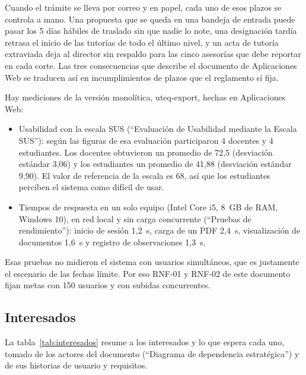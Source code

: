 Cuando el trámite se lleva por correo y en papel, cada uno de esos plazos se controla a mano. Una propuesta que se queda en una bandeja de entrada puede pasar los 5 días hábiles de traslado sin que nadie lo note, una designación tardía retrasa el inicio de las tutorías de todo el último nivel, y un acta de tutoría extraviada deja al director sin respaldo para las cinco asesorías que debe reportar en cada corte. Las tres consecuencias que describe el documento de Aplicaciones Web se traducen así en incumplimientos de plazos que el reglamento sí fija.

Hay mediciones de la versión monolítica, uteq-export, hechas en Aplicaciones Web:

\begin{itemize}
  \item Usabilidad con la escala SUS (\enquote{Evaluación de Usabilidad mediante la Escala SUS}): según las figuras de esa evaluación participaron 4 docentes y 4 estudiantes. Los docentes obtuvieron un promedio de 72,5 (desviación estándar 3,06) y los estudiantes un promedio de 41,88 (desviación estándar 9,90). El valor de referencia de la escala es 68, así que los estudiantes perciben el sistema como difícil de usar.
  \item Tiempos de respuesta en un solo equipo (Intel Core i5, 8~GB de RAM, Windows 10), en red local y sin carga concurrente (\enquote{Pruebas de rendimiento}): inicio de sesión 1,2~s, carga de un PDF 2,4~s, visualización de documentos 1,6~s y registro de observaciones 1,3~s.
\end{itemize}

Esas pruebas no midieron el sistema con usuarios simultáneos, que es justamente el escenario de las fechas límite. Por eso RNF-01 y RNF-02 de este documento fijan metas con 150 usuarios y con subidas concurrentes.

\subsection{Interesados}

La tabla~\ref{tab:interesados} resume a los interesados y lo que espera cada uno, tomado de los actores del documento (\enquote{Diagrama de dependencia estratégica}) y de sus historias de usuario y requisitos.

